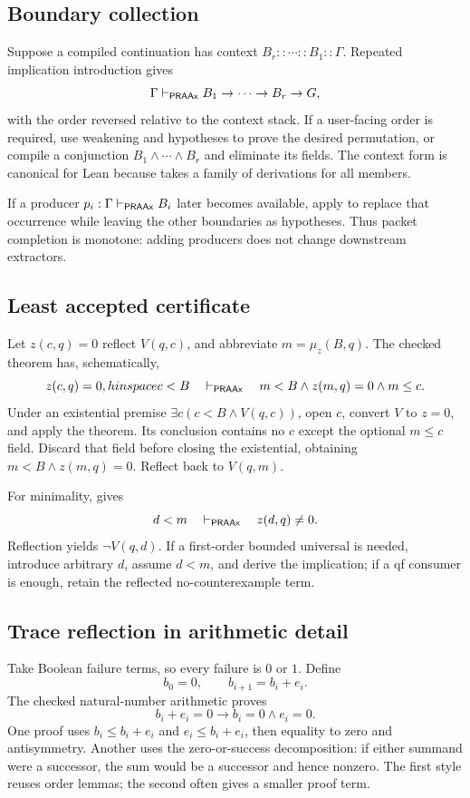 \subsection{Boundary collection}

Suppose a compiled continuation has context
\(B_r::\cdots::B_1::\Gamma\).  Repeated implication introduction gives
\[
 \Gamma\mathrel{\vdash_{\mathsf{PRAAx}}} B_1\to\cdots\to B_r\to G,
\]
with the order reversed relative to the context stack.  If a user-facing order
is required, use weakening and hypotheses to prove the desired permutation,
or compile a conjunction
\(B_1\wedge\cdots\wedge B_r\) and eliminate its fields.  The context form is
canonical for Lean because  takes a family of derivations for
all members.

If a producer \(p_i:\Gamma\mathrel{\vdash_{\mathsf{PRAAx}}} B_i\) later becomes available, apply
 to replace that occurrence while leaving the other boundaries
as hypotheses.  Thus packet completion is monotone: adding producers does not
change downstream extractors.

\subsection{Least accepted certificate}

Let \(z(c,q)=0\) reflect \(V(q,c)\), and abbreviate
\(m=\mu_z(B,q)\).  The checked theorem  has, schematically,
\[
  z(c,q)=0,	hinspace c<B
   \quad\mathrel{\vdash_{\mathsf{PRAAx}}}\quad
  m<B\wedge z(m,q)=0\wedge m\le c.
\]
Under an existential premise
\(\exists c(c<B\wedge V(q,c))\), open \(c\), convert \(V\) to \(z=0\), and
apply the theorem.  Its conclusion contains no \(c\) except the optional
\(m\le c\) field.  Discard that field before closing the existential, obtaining
\(m<B\wedge z(m,q)=0\).  Reflect back to \(V(q,m)\).

For minimality,  gives
\[
 d<m\quad\mathrel{\vdash_{\mathsf{PRAAx}}}\quad z(d,q)\ne 0.
\]
Reflection yields \(\neg V(q,d)\).  If a first-order bounded universal is
needed, introduce arbitrary \(d\), assume \(d<m\), and derive the implication;
if a qf consumer is enough, retain the reflected no-counterexample term.

\subsection{Trace reflection in arithmetic detail}

Take Boolean failure terms, so every failure is \(0\) or \(1\).  Define
\[
  b_0=0,\qquad b_{i+1}=b_i+e_i.
\]
The checked natural-number arithmetic proves
\[
 b_i+e_i=0\to b_i=0\wedge e_i=0.
\]
One proof uses \(b_i\le b_i+e_i\) and \(e_i\le b_i+e_i\), then equality to
zero and antisymmetry.  Another uses the zero-or-success decomposition: if
either summand were a successor, the sum would be a successor and hence
nonzero.  The first style reuses order lemmas; the second often gives a smaller
proof term.


